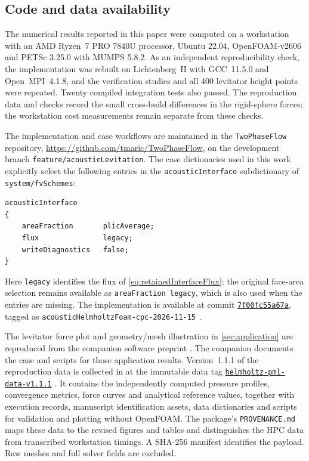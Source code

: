 \documentclass[final,12pt,nopreprintline,longtitle]{elsarticle}
\begin{document}
\begin{samepage}
\section*{Code and data availability}

The numerical results reported in this paper were computed on a workstation
with an AMD Ryzen~7 PRO 7840U processor, Ubuntu 22.04, OpenFOAM-v2606
and PETSc 3.25.0 with MUMPS 5.8.2.  As an independent reproducibility
check, the implementation was rebuilt on Lichtenberg~II with GCC~11.5.0
and Open~MPI~4.1.8, and the verification studies and all 400 levitator
height points were repeated.  Twenty compiled integration tests also passed.
The reproduction data and checks record the small cross-build differences
in the rigid-sphere forces; the workstation cost measurements remain
separate from these checks.

The implementation and case workflows are maintained in the
\texttt{TwoPhaseFlow} repository,
\url{https://github.com/tmaric/TwoPhaseFlow}, on the development branch
\texttt{feature/acousticLevitation}.  The case dictionaries used in this work
explicitly select the following entries in the
\texttt{acousticInterface} subdictionary of \texttt{system/fvSchemes}:
\begin{verbatim}
acousticInterface
{
    areaFraction       plicAverage;
    flux               legacy;
    writeDiagnostics   false;
}
\end{verbatim}
\end{samepage}
Here \texttt{legacy} identifies the flux of \cref{eq:retainedInterfaceFlux};
the original face-area selection remains available as
\texttt{areaFraction legacy}, which is also used when the entries are
missing.  The implementation is available at commit
\href{https://github.com/tmaric/TwoPhaseFlow/tree/7f00fc55a67aefbcfa88bdb46a4fc378bac0db0c}{\texttt{7f00fc55a67a}}, tagged as
\texttt{acousticHelmholtzFoam-cpc-2026-11-15}~\cite{XuLiuMaric2026AcousticSoftware}.

The levitator force plot and geometry/mesh illustration in
\cref{sec:application} are reproduced from the companion software preprint
\cite{Xu2026AcousticHelmholtzFoam}.  The companion documents the case and scripts for those
application results.  Version~1.1.1 of the reproduction data is collected in
 at the immutable data tag
\href{https://github.com/tmaric/TwoPhaseFlow/tree/helmholtz-pml-data-v1.1.1/data/publications/helmholtz-pml-v1.1.1}{\texttt{helmholtz-pml-data-v1.1.1}}
\cite{XuMaric2026HelmholtzPMLData}.  It contains the independently computed
pressure profiles, convergence metrics, force curves and analytical reference
values, together with execution records, manuscript identification assets,
data dictionaries and scripts for validation and plotting without OpenFOAM.
The package's \texttt{PROVENANCE.md} maps these data to the revised figures
and tables and distinguishes the HPC data from transcribed workstation
timings.  A SHA-256 manifest identifies the payload.  Raw meshes and full
solver fields are excluded.
\end{document}
